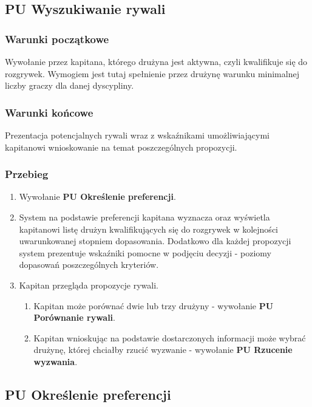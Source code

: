 \subsection{PU Wyszukiwanie rywali}

\subsubsection{Warunki początkowe}
Wywołanie przez kapitana, którego drużyna jest aktywna, czyli kwalifikuje się do rozgrywek. Wymogiem jest tutaj spełnienie przez drużynę warunku minimalnej liczby graczy dla danej dyscypliny.

\subsubsection{Warunki końcowe}
Prezentacja potencjalnych rywali wraz z wskaźnikami umożliwiającymi kapitanowi wnioskowanie na temat poszczególnych propozycji.

\subsubsection{Przebieg}
\begin{enumerate}
  \item Wywołanie \textbf{PU Określenie preferencji}.
  \item System na podstawie preferencji kapitana wyznacza oraz wyświetla kapitanowi listę drużyn kwalifikujących się do rozgrywek w kolejności uwarunkowanej stopniem dopasowania. Dodatkowo dla każdej propozycji system prezentuje wskaźniki pomocne w podjęciu decyzji - poziomy dopasowań poszczególnych kryteriów.
  \item Kapitan przegląda propozycje rywali.
  \begin{enumerate}[label=(\alph*)]
     \item Kapitan może porównać dwie lub trzy drużyny - wywołanie \textbf{PU Porównanie rywali}.
     \item Kapitan wnioskując na podstawie dostarczonych informacji może wybrać drużynę, której chciałby rzucić wyzwanie - wywołanie \textbf{PU Rzucenie wyzwania}.
   \end{enumerate}
   

\end{enumerate}

\subsection{PU Określenie preferencji}

